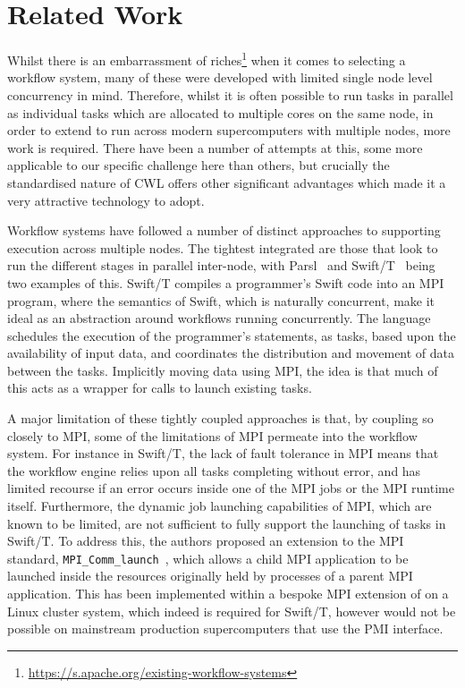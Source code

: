 \documentclass[conference]{IEEEtran}
\begin{document}
\section{Related Work}
\label{sec:bg}
Whilst there is an embarrassment of riches\footnote{\url{https://s.apache.org/existing-workflow-systems}} when it comes to selecting a workflow system, many of these were developed with limited single node level concurrency in mind. Therefore, whilst it is often possible to run tasks in parallel as individual tasks which are allocated to multiple cores on the same node, in order to extend to run across modern supercomputers with multiple nodes, more work is required. There have been a number of attempts at this, some more applicable to our specific challenge here than others, but crucially the standardised nature of CWL offers other significant advantages which made it a very attractive technology to adopt.

Workflow systems have followed a number of distinct approaches to supporting execution across multiple nodes. The tightest integrated are those that look to run the different stages in parallel inter-node, with Parsl~\cite{babuji2019parsl} and Swift/T~\cite{armstrong2014compiler} being two examples of this. Swift/T compiles a programmer's Swift code into an MPI program, where the semantics of Swift, which is naturally concurrent, make it ideal as an abstraction around workflows running concurrently. The language schedules the execution of the programmer's statements, as tasks, based upon the availability of input data, and coordinates the distribution and movement of data between the tasks. Implicitly moving data using MPI, the idea is that much of this acts as a wrapper for calls to launch existing tasks.

A major limitation of these tightly coupled approaches is that, by coupling so closely to MPI, some of the limitations of MPI permeate into the workflow system. For instance in Swift/T, the lack of fault tolerance in MPI means that the workflow engine relies upon all tasks completing without error, and has limited recourse if an error occurs inside one of the MPI jobs or the MPI runtime itself. Furthermore, the dynamic job launching capabilities of MPI, which are known to be limited, are not sufficient to fully support the launching of tasks in Swift/T. To address this, the authors proposed an extension to the MPI standard, \texttt{MPI_Comm_launch}~\cite{wozniak2019mpi}, which allows a child MPI application to be launched inside the resources originally held by processes of a parent MPI application. This has been implemented within a bespoke MPI extension of on a Linux cluster system, which indeed is required for Swift/T, however would not be possible on mainstream production supercomputers that use the PMI interface.
\end{document}
